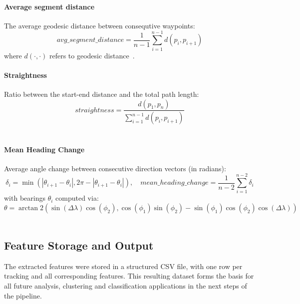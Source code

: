 \documentclass[a4paper,12pt,twoside]{scrreprt}
\begin{document}
\paragraph{Average segment distance}

The average geodesic distance between consequtive waypoints:
\[
  avg\_segment\_distance = \frac{1}{n-1} \sum_{i=1}^{n-1} d(p_i, p_{i+1})
\]
where $d(\cdot, \cdot)$ refers to geodesic
distance~\cite{franti_averaging_2021}.

\paragraph{Straightness}
Ratio between the start-end distance and the total path length:
\[
  straightness = \frac{d(p_1, p_n)}{\sum_{i=1}^{n-1} d(p_i, p_{i+1})}
\]
~\cite{benhamou_how_2004}

\paragraph{Mean Heading Change}
Average angle change between consecutive direction vectors (in radians):
\[
  \delta_i = \min(|\theta_{i+1} - \theta_i|, 2\pi - |\theta_{i+1} - \theta_i|),
  \quad
  mean\_heading\_change = \frac{1}{n-2} \sum_{i=1}^{n-2} \delta_i
\]
with bearings $\theta_i$ computed via:
\[
  \theta = \arctan2\left( \sin(\Delta \lambda) \cos(\phi_2),
  \cos(\phi_1)\sin(\phi_2) - \sin(\phi_1)\cos(\phi_2)\cos(\Delta \lambda)
  \right)
\]
~\cite{etemad_predicting_2018}

\subsection{Feature Storage and Output}

The extracted features were stored in a structured CSV file, with one row per
tracking and all corresponding features. This resulting dataset forms the
basis for all future analysis, clustering and classification applications in
the next steps of the pipeline.
\end{document}

